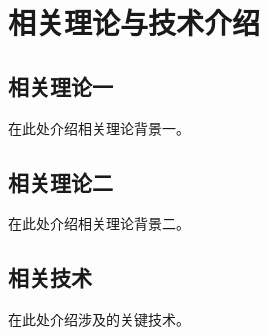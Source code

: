 
\chapter{相关理论与技术介绍}

\section{相关理论一}

在此处介绍相关理论背景一。

\section{相关理论二}

在此处介绍相关理论背景二。

\section{相关技术}

在此处介绍涉及的关键技术。
